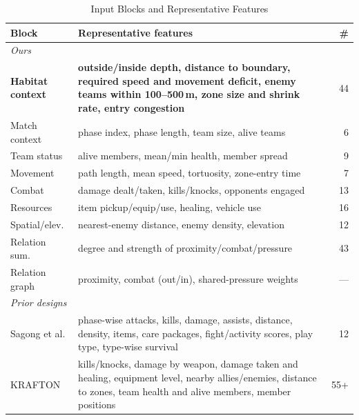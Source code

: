 \documentclass[sigconf,anonymous,nonacm]{acmart}
\begin{document}
\begin{table}[t]
\centering
\caption{Input Blocks and Representative Features}
\label{tab:blocks}
\footnotesize
\setlength{\tabcolsep}{3pt}
\begin{tabular}{p{1.45cm}p{5.8cm}r}
\hline
Block & Representative features & \# \\
\hline
\multicolumn{3}{l}{\emph{Ours}} \\
\textbf{Habitat context} & \textbf{outside/inside depth, distance to boundary, required speed and movement deficit, enemy teams within 100--500\,m, zone size and shrink rate, entry congestion} & 44 \\
Match context & phase index, phase length, team size, alive teams & 6 \\
Team status & alive members, mean/min health, member spread & 9 \\
Movement & path length, mean speed, tortuosity, zone-entry time & 7 \\
Combat & damage dealt/taken, kills/knocks, opponents engaged & 13 \\
Resources & item pickup/equip/use, healing, vehicle use & 16 \\
Spatial/elev. & nearest-enemy distance, enemy density, elevation & 12 \\
Relation sum. & degree and strength of proximity/combat/pressure & 43 \\
Relation graph & proximity, combat (out/in), shared-pressure weights & --- \\
\hline
\multicolumn{3}{l}{\emph{Prior designs}} \\
Sagong et al. & phase-wise attacks, kills, damage, assists, distance, density, items, care packages, fight/activity scores, play type, type-wise survival & 12 \\
KRAFTON & kills/knocks, damage by weapon, damage taken and healing, equipment level, nearby allies/enemies, distance to zones, team health and alive members, member positions & 55+ \\
\hline
\end{tabular}
\end{table}
\end{document}
